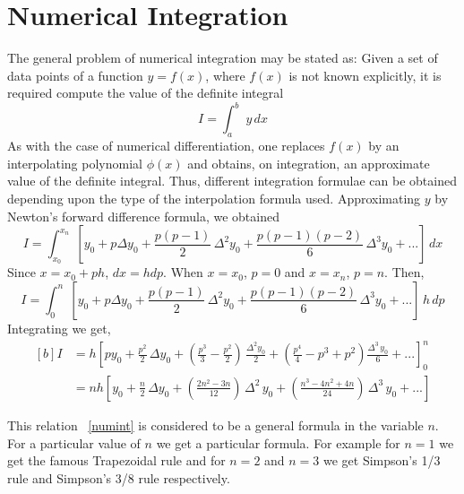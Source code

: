 \documentclass[aima203_lecturenotes_ku.tex]{subfiles}
\begin{document}
\section{Numerical Integration}
The general problem of numerical integration may be stated as: Given a set of data points of a function $y=f(x)$, where $f(x)$ is not known explicitly, it is required compute the value of the definite integral $$I = \int_a^b \; y\,dx$$ As with the case of numerical differentiation, one replaces $f(x)$ by an interpolating polynomial $\phi(x)$ and obtains, on integration, an approximate value of the definite integral. Thus, different integration formulae can be obtained depending upon the type of the interpolation formula used. Approximating $y$ by Newton's forward difference formula, we obtained
$$ I = \int_{x_0}^{x_n} \; \left [ y_0 + p \Delta y_0 + \frac{p(p-1)}{2}\, \Delta^2 y_0 + \frac{p(p-1)(p-2)}{6}\, \Delta ^3 y_0 + ... \right ] \, dx$$
Since $x=x_0 +ph$, $dx = hdp$. When $x=x_0$, $p=0$ and $x=x_n$, $p=n$. Then,
$$ I = \int_{0}^{n} \; \left [ y_0 + p \Delta y_0 + \frac{p(p-1)}{2}\, \Delta^2 y_0 + \frac{p(p-1)(p-2)}{6}\, \Delta ^3 y_0 + ... \right ] \, h\,dp$$
Integrating we get,
\begin{equation}
  \label{numint}
  \begin{aligned}[b]
    I &= h \left [ py_0 + \frac{p^2}{2}\, \Delta y_0 + \left ( \frac{p^3}{3} - \frac{p^2}{2} \right ) \, \frac{\Delta^2 y_0}{2} +  \left ( \frac{p^4}{4} - p^3 + p^2 \right ) \frac{\Delta ^3 \, y_0}{6} + ... \right ]_0^n \\[1mm]
    &= nh \left [ y_0 + \frac{n}{2}\, \Delta y_0 + \left ( \frac{2n^2-3n}{12} \right ) \, \Delta^2\, y_0 +  \left ( \frac{n^3 - 4n^2 +4n}{24} \right ) \, \Delta ^3 \, y_0 + ... \right ]
  \end{aligned}
\end{equation}

This relation ~\ref{numint} is considered to be a general formula in the variable $n$. For a particular value of $n$ we get a particular formula. For example for $n=1$ we get the famous Trapezoidal rule and for $n=2$ and $n=3$ we get Simpson's 1/3 rule and Simpson's 3/8 rule respectively.
\end{document}

